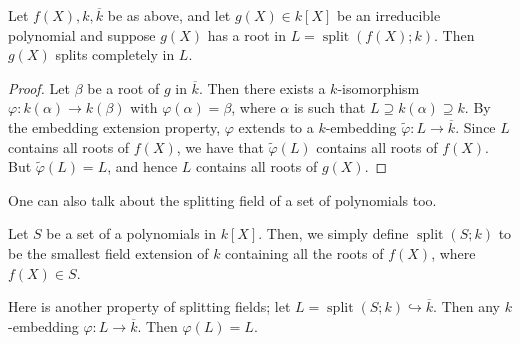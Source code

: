 Let $f(X),k,\overline{k}$ be as above, and let $g(X) \in k[X]$ be an irreducible polynomial and suppose $g(X)$ has a root in $L = \operatorname{split}(f(X);k)$. Then $g(X)$ splits completely in $L$.


\begin{proof}
    Let $\beta$ be a root of $g$ in $\overline{k}$. Then there exists a $k$-isomorphism $\varphi:k(\alpha) \to k(\beta)$ with $\varphi(\alpha) = \beta$, where $\alpha$ is such that $L \supseteq k(\alpha) \supseteq k$. By the embedding extension property, $\varphi$ extends to a $k$-embedding $\tilde{\varphi}:L \to \overline{k}$. Since $L$ contains all roots of $f(X)$, we have that $\tilde{\varphi}(L)$ contains all roots of $f(X)$. But $\tilde{\varphi}(L) = L$, and hence $L$ contains all roots of $g(X)$.
\end{proof}

One can also talk about the splitting field of a set of polynomials too.

\begin{definition}
    Let $S$ be a set of a polynomials in $k[X]$. Then, we simply define $\operatorname{split}(S;k)$ to be the smallest field extension of $k$ containing all the roots of $f(X)$, where $f(X) \in S$.
\end{definition}

Here is another property of splitting fields; let $L = \operatorname{split}(S;k) \hookrightarrow \overline{k}$. Then any $k$-embedding $\varphi:L \to \overline{k}$. Then $\varphi(L) = L$.